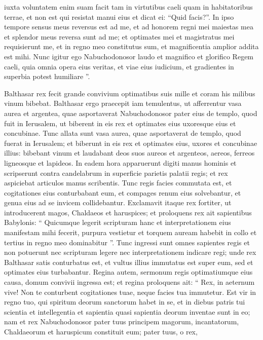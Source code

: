\begin{biblechapter}
\begin{biblechapter}
\begin{biblechapter}
\begin{biblechapter}
 iuxta voluntatem enim suam facit
 tam in virtutibus caeli quam in habitatoribus terrae,
 et non est qui resistat manui eius
 et dicat ei: “Quid facis?”.
 \verse In ipso tempore sensus meus reversus est ad me, et ad honorem regni mei maiestas mea et splendor meus reversa sunt ad me; et optimates mei et magistratus mei requisierunt me, et in regno meo constitutus sum, et magnificentia amplior addita est mihi. 
\verse Nunc igitur ego Nabuchodonosor laudo et magnifico et glorifico Regem caeli, quia omnia opera eius veritas, et viae eius iudicium, et gradientes in superbia potest humiliare ”.
 
\begin{biblechapter}
\verse Balthasar rex fecit grande convivium optimatibus suis mille et coram his milibus vinum bibebat. 
\verse Balthasar ergo praecepit iam temulentus, ut afferrentur vasa aurea et argentea, quae asportaverat Nabuchodonosor pater eius de templo, quod fuit in Ierusalem, ut biberent in eis rex et optimates eius uxoresque eius et concubinae. 
\verse Tunc allata sunt vasa aurea, quae asportaverat de templo, quod fuerat in Ierusalem; et biberunt in eis rex et optimates eius, uxores et concubinae illius: 
\verse bibebant vinum et laudabant deos suos aureos et argenteos, aereos, ferreos ligneosque et lapideos.
 \verse In eadem hora apparuerunt digiti manus hominis et scripserunt contra candelabrum in superficie parietis palatii regis; et rex aspiciebat articulos manus scribentis. 
\verse Tunc regis facies commutata est, et cogitationes eius conturbabant eum, et compages renum eius solvebantur, et genua eius ad se invicem collidebantur. 
\verse Exclamavit itaque rex fortiter, ut introducerent magos, Chaldaeos et haruspices; et proloquens rex ait sapientibus Babylonis: “ Quicumque legerit scripturam hanc et interpretationem eius manifestam mihi fecerit, purpura vestietur et torquem auream habebit in collo et tertius in regno meo dominabitur ”. 
\verse Tunc ingressi sunt omnes sapientes regis et non potuerunt nec scripturam legere nec interpretationem indicare regi; 
\verse unde rex Balthasar satis conturbatus est, et vultus illius immutatus est super eum, sed et optimates eius turbabantur. 
\verse Regina autem, sermonum regis optimatiumque eius causa, domum convivii ingressa est; et regina proloquens ait: “ Rex, in aeternum vive! Non te conturbent cogitationes tuae, neque facies tua immutetur. 
\verse Est vir in regno tuo, qui spiritum deorum sanctorum habet in se, et in diebus patris tui scientia et intellegentia et sapientia quasi sapientia deorum inventae sunt in eo; nam et rex Nabuchodonosor pater tuus principem magorum, incantatorum, Chaldaeorum et haruspicum constituit eum; pater tuus, o rex, 

\end{biblechapter}
\end{biblechapter}
\end{biblechapter}
\end{biblechapter}
\end{biblechapter}
